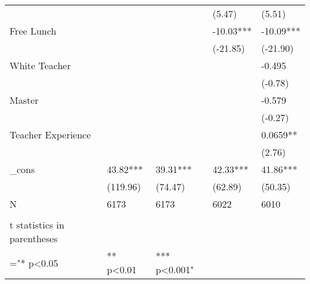 \documentclass{article}
\begin{document}
{{{{{{{{{{{\begin{table}[htbp]
\begin{tabular}{lrllrr}
          &       &       &       & \multicolumn{1}{l}{(5.47)} & \multicolumn{1}{l}{(5.51)} \\
    \multicolumn{2}{l}{Free Lunch} &       &       & \multicolumn{1}{l}{-10.03***} & \multicolumn{1}{l}{-10.09***} \\
          &       &       &       & \multicolumn{1}{l}{(-21.85)} & \multicolumn{1}{l}{(-21.90)} \\
    \multicolumn{2}{l}{White Teacher} &       &       & \multicolumn{1}{l}{} & \multicolumn{1}{l}{-0.495} \\
          &       &       &       & \multicolumn{1}{l}{} & \multicolumn{1}{l}{(-0.78)} \\
    \multicolumn{2}{l}{Master} &       &       & \multicolumn{1}{l}{} & \multicolumn{1}{l}{-0.579} \\
          &       &       &       & \multicolumn{1}{l}{} & \multicolumn{1}{l}{(-0.27)} \\
    \multicolumn{2}{l}{Teacher Experience} &       &       & \multicolumn{1}{l}{} & \multicolumn{1}{l}{0.0659**} \\
          &       &       &       & \multicolumn{1}{l}{} & \multicolumn{1}{l}{(2.76)} \\
    \multicolumn{2}{l}{\_cons} & 43.82*** & 39.31*** & \multicolumn{1}{l}{42.33***} & \multicolumn{1}{l}{41.86***} \\
          &       & (119.96) & (74.47) & \multicolumn{1}{l}{(62.89)} & \multicolumn{1}{l}{(50.35)} \\
    \multicolumn{2}{l}{N} & 6173  & 6173  & \multicolumn{1}{l}{6022} & \multicolumn{1}{l}{6010} \\
    \midrule
          &       &       &       &       &  \\
    t statistics in parentheses &       &       &       &       &  \\
    ="* p<0.05 &       &  ** p<0.01 &  *** p<0.001" &       &  \\
    \end{tabular}%
  \label{tab:addlabel}%
\end{table}%


}}}}}}}}}}}
\end{document}
